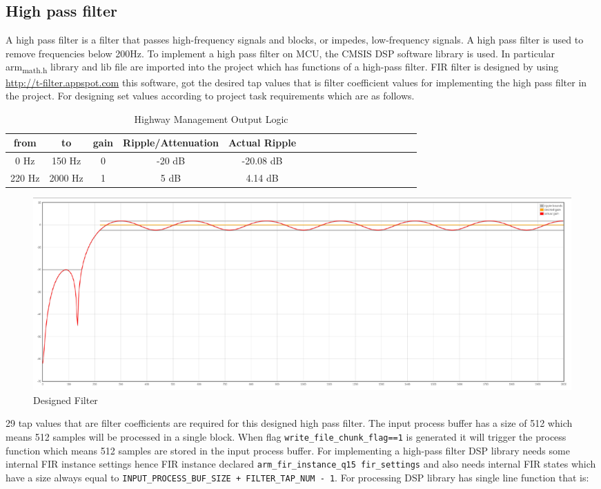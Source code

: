 \documentclass[11pt]{article}
\begin{document}
\subsection{High pass filter}
\label{sec:org7e532f7}

A high pass filter is a filter that passes high-frequency signals and blocks, or impedes, low-frequency signals. A high pass filter is used to remove frequencies below 200Hz.
To implement a high pass filter on MCU, the CMSIS DSP software library is used. In particular arm\textsubscript{math.h} library and lib file are imported into the project which has functions of a high-pass filter.
FIR filter is designed by using \url{http://t-filter.appspot.com} this software, got the desired tap values that is filter coefficient values for implementing the high pass filter in the project. For designing set values according to project task requirements which are as follows.


\begin{table}[htbp]
\centering
\begin{tabular}{|c|c|c|c|c|c|c|c|c|c|c|c|c|c|c|c|c|}
\hline
from & to & gain & Ripple/Attenuation & Actual Ripple\\
\hline
0 Hz & 150 Hz & 0 & -20 dB & -20.08 dB\\
220 Hz & 2000 Hz & 1 & 5 dB & 4.14 dB\\
\hline
\end{tabular}
\caption{Highway Management Output Logic}

\end{table}


\begin{figure}[H]
    \centering
    \includegraphics[width=1\textwidth, trim={0cm 0cm 0cm 0cm}, clip]{Filter.pdf}
    \caption{Designed Filter}
    \end{figure}


29 tap values that are filter coefficients are required for this designed high pass filter. The input process buffer has a size of 512 which means 512 samples will be processed in a single block.
When flag \texttt{write\_file\_chunk\_flag==1} is generated it will trigger the process function which means 512 samples are stored in the input process buffer.
For implementing a high-pass filter DSP library needs some internal FIR instance settings hence FIR instance declared \texttt{arm\_fir\_instance\_q15 fir\_settings} and also needs internal FIR states which have a size always equal to \texttt{INPUT\_PROCESS\_BUF\_SIZE + FILTER\_TAP\_NUM - 1}.
For processing DSP library has single line function that is:
\end{document}
